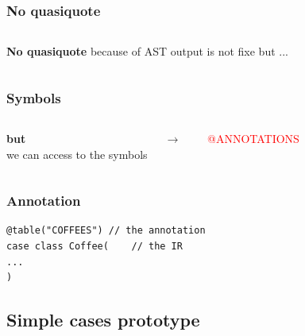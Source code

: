 \documentclass{beamer}
\newcommand{\TCR}{\textcolor{red}}
\begin{document}

\begin{frame}
\frametitle{No quasiquote}
\begin{columns}[c] %

\textbf{No quasiquote}
because of AST output is not fixe
but ...
\end{columns}
\end{frame}


\begin{frame}
\frametitle{Symbols}
\begin{columns}[c] %

\textbf{but}\\
we can access to the symbols 

$\rightarrow$

~ \TCR{@ANNOTATIONS}

\end{columns}
\end{frame}


\begin{frame}[fragile]
\frametitle{Annotation}

\begin{lstlisting}
@table("COFFEES") // the annotation
case class Coffee(    // the IR
...
)
\end{lstlisting}

\end{frame}

\subsection{Simple cases prototype}

\end{document}
